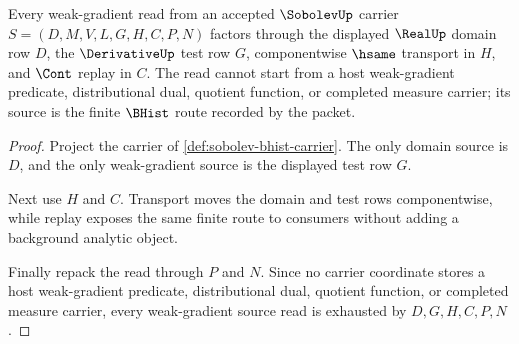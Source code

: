 \begin{theorem}
\label{thm:sobolev-weak-gradient-source-totality}
Every weak-gradient read from an accepted $\SobolevUp$ carrier $S=(D,M,V,L,G,H,C,P,N)$ factors through the displayed $\RealUp$ domain row $D$, the $\DerivativeUp$ test row $G$, componentwise $\hsame$ transport in $H$, and $\Cont$ replay in $C$. The read cannot start from a host weak-gradient predicate, distributional dual, quotient function, or completed measure carrier; its source is the finite $\BHist$ route recorded by the packet.
\end{theorem}
\begin{proof}
Project the carrier of \autoref{def:sobolev-bhist-carrier}. The only domain source is $D$, and the only weak-gradient source is the displayed test row $G$.

Next use $H$ and $C$. Transport moves the domain and test rows componentwise, while replay exposes the same finite route to consumers without adding a background analytic object.

Finally repack the read through $P$ and $N$. Since no carrier coordinate stores a host weak-gradient predicate, distributional dual, quotient function, or completed measure carrier, every weak-gradient source read is exhausted by $D,G,H,C,P,N$.
\end{proof}

